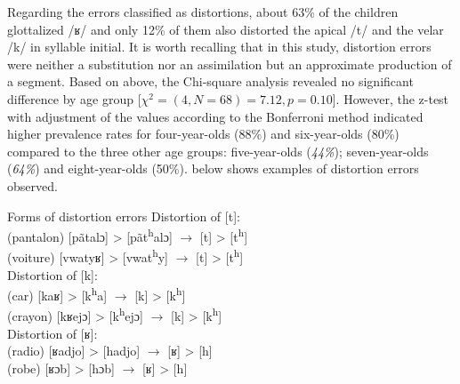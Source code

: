 \documentclass[output=paper,newtxmath,modfonts,nonflat,draftmode]{langsci/langscibook}
\begin{document}
Regarding the errors classified as distortions, about 63\% of the children glottalized /ʁ/ and only 12\% of them also distorted the apical /t/ and the velar /k/ in syllable initial. It is worth recalling that in this study, distortion errors were neither a substitution nor an assimilation but an approximate production of a segment. Based on  above, the Chi-square analysis revealed no significant difference by age group [$\chi^2 = (4, N=68) = 7.12, p=0.10$]. However, the z-test with adjustment of the values according to the Bonferroni method indicated higher prevalence rates for four-year-olds (88\%) and six-year-olds (80\%) compared to the three other age groups: five-year-olds (\textit{44\%}); seven-year-olds (\textit{64\%}) and eight-year-olds (50\%).  below shows examples of distortion errors observed. 

\ea Forms of distortion errors \label{ex:takam:distortion_errors}
\ea Distortion of [t]:\\
(pantalon) [pãtalɔ] > [pãt\textsuperscript{h}alɔ] $\rightarrow$ [t] > [t\textsuperscript{h}]\\
(voiture) [vwatyʁ] > [vwat\textsuperscript{h}y] $\rightarrow$ [t] > [t\textsuperscript{h}]\\
\ex Distortion of [k]:\\ 
(car) [kaʁ] > [k\textsuperscript{h}a] $\rightarrow$ [k] > [k\textsuperscript{h}]\\
(crayon) [kʁejɔ] > [k\textsuperscript{h}ejɔ] $\rightarrow$ [k] > [k\textsuperscript{h}]\\
\ex Distortion of [ʁ]:\\
(radio) [ʁadjo] > [hadjo] $\rightarrow$ [ʁ] > [h]\\
(robe) [ʁɔb] > [hɔb] $\rightarrow$ [ʁ] > [h] \\
\z
\z

\end{document}
